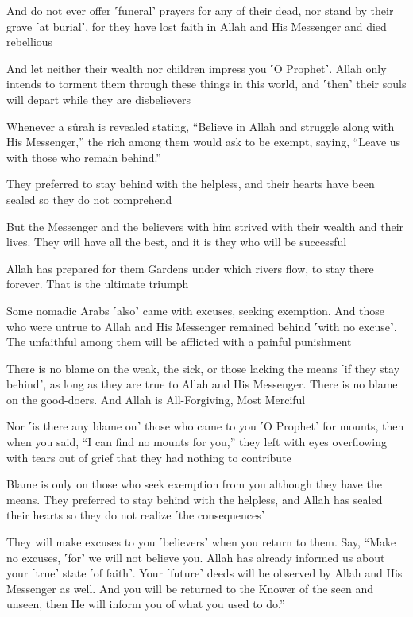 And do not ever offer ˹funeral˺ prayers for any of their dead, nor stand by their grave ˹at burial˺, for they have lost faith in Allah and His Messenger and died rebellious

And let neither their wealth nor children impress you ˹O Prophet˺. Allah only intends to torment them through these things in this world, and ˹then˺ their souls will depart while they are disbelievers

Whenever a sûrah is revealed stating, “Believe in Allah and struggle along with His Messenger,” the rich among them would ask to be exempt, saying, “Leave us with those who remain behind.”

They preferred to stay behind with the helpless, and their hearts have been sealed so they do not comprehend

But the Messenger and the believers with him strived with their wealth and their lives. They will have all the best, and it is they who will be successful

Allah has prepared for them Gardens under which rivers flow, to stay there forever. That is the ultimate triumph

Some nomadic Arabs ˹also˺ came with excuses, seeking exemption. And those who were untrue to Allah and His Messenger remained behind ˹with no excuse˺. The unfaithful among them will be afflicted with a painful punishment

There is no blame on the weak, the sick, or those lacking the means ˹if they stay behind˺, as long as they are true to Allah and His Messenger. There is no blame on the good-doers. And Allah is All-Forgiving, Most Merciful

Nor ˹is there any blame on˺ those who came to you ˹O Prophet˺ for mounts, then when you said, “I can find no mounts for you,” they left with eyes overflowing with tears out of grief that they had nothing to contribute

Blame is only on those who seek exemption from you although they have the means. They preferred to stay behind with the helpless, and Allah has sealed their hearts so they do not realize ˹the consequences˺

They will make excuses to you ˹believers˺ when you return to them. Say, “Make no excuses, ˹for˺ we will not believe you. Allah has already informed us about your ˹true˺ state ˹of faith˺. Your ˹future˺ deeds will be observed by Allah and His Messenger as well. And you will be returned to the Knower of the seen and unseen, then He will inform you of what you used to do.”

